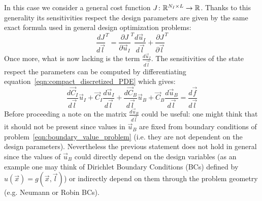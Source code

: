 In this case we consider a general cost function $J \colon \mathbb{R}^{N_I \times L} \to \mathbb{R}$. Thanks to this generality its sensitivities respect the design parameters are given by the same exact formula used in general design optimization problems:
\begin{equation}
	\label{eqn:gradient_1st_step_1D_RBF-FD}
	\frac{dJ}{d\vec{l}}^T = \frac{\partial J}{\partial \vec{u}_I}^T \frac{d\vec{u}_I}{d\vec{l}} + \frac{\partial J}{\partial \vec{l}}^T
\end{equation}
Once more, what is now lacking is the term $\frac{d\vec{u}_I}{d\vec{l}}$. The sensitivities of the state respect the parameters can be computed by differentiating equation~\eqref{eqn:compact_discretized_PDE} which gives:
\begin{equation}
	\frac{d\vec{C}_I}{d\vec{l}} \vec{u}_I + \vec{C}_I \frac{d\vec{u}_I}{d\vec{l}} + \frac{d\vec{C}_B}{d\vec{l}} \vec{u}_B + \vec{C}_B \frac{d\vec{u}_B}{d\vec{l}} =
	\frac{d\vec{f}}{d\vec{l}}
\end{equation} 
Before proceeding a note on the matrix $\frac{d\vec{u}_B}{d\vec{l}}$ could be useful: one might think that it should not be present since values in $\vec{u}_B$ are fixed from boundary conditions of problem~\eqref{eqn:boundary_value_problem} (i.e. they are not dependent on the design parameters).
Nevertheless the previous statement does not hold in general since the values of $\vec{u}_B$ could directly depend on the design variables (as an example one may think of Dirichlet Boundary Conditions (BCs) defined by $u(\vec{x})=g(\vec{x}, \vec{l})$) or indirectly depend on them through the problem geometry (e.g. Neumann or Robin BCs).

